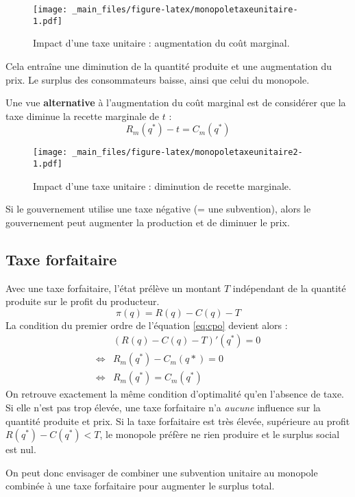 \documentclass[
  a4paper,
]{book}
\theoremstyle{definition}
\theoremstyle{definition}
\theoremstyle{definition}
\theoremstyle{definition}
\theoremstyle{remark}
\begin{document}
\begin{figure}
\centering
\texttt{[image: \_main\_files/figure-latex/monopoletaxeunitaire-1.pdf]}
\caption{\label{fig:monopoletaxeunitaire}Impact d'une taxe unitaire : augmentation du coût marginal.}
\end{figure}

Cela entraîne une diminution de la quantité produite et une augmentation du prix.
Le surplus des consommateurs baisse, ainsi que celui du monopole.

Une vue \textbf{alternative} à l'augmentation du coût marginal est de considérer que la taxe diminue la recette marginale de \(t\) :
\[
 R_m(q^*) -t = C_m(q^*)
\]

\begin{figure}
\centering
\texttt{[image: \_main\_files/figure-latex/monopoletaxeunitaire2-1.pdf]}
\caption{\label{fig:monopoletaxeunitaire2}Impact d'une taxe unitaire : diminution de recette marginale.}
\end{figure}

Si le gouvernement utilise une taxe négative (= une subvention), alors le gouvernement peut augmenter la production et de diminuer le prix.

\hypertarget{taxe-forfaitaire}{%
\subsection{Taxe forfaitaire}\label{taxe-forfaitaire}}

Avec une taxe forfaitaire, l'état prélève un montant \(T\) indépendant de la quantité produite sur le profit du producteur.
\[
\pi(q) = R(q) - C(q) -T
\]
La condition du premier ordre de l'équation \eqref{eq:cpo} devient alors :
\[
\begin{array}{rl}
& (R(q)-C(q) -T)'(q^*) = 0\\
\Leftrightarrow & R_m(q^*)-C_m(q*) = 0\\
\Leftrightarrow & R_m(q^*) = C_m(q^*)
\end{array}
\]
On retrouve exactement la même condition d'optimalité qu'en l'absence de taxe.
Si elle n'est pas trop élevée, une taxe forfaitaire n'a \emph{aucune} influence sur la quantité produite et prix.
Si la taxe forfaitaire est très élevée, supérieure au profit \(R(q^*) - C(q^*) <T\), le monopole préfère ne rien produire et le surplus social est nul.

On peut donc envisager de combiner une subvention unitaire au monopole combinée à une taxe forfaitaire pour augmenter le surplus total.
\end{document}
